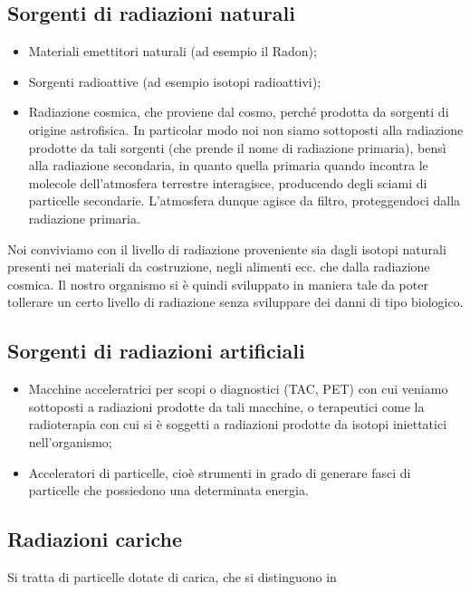 \subsection{Sorgenti di radiazioni naturali}

\begin{itemize}[leftmargin=0.5cm]
    \item Materiali emettitori naturali (ad esempio il Radon);
    \item Sorgenti radioattive (ad esempio isotopi radioattivi);
    \item Radiazione cosmica, che proviene dal cosmo, perché prodotta da sorgenti di origine astrofisica. In particolar modo noi non siamo sottoposti alla radiazione prodotte da tali sorgenti (che prende il nome di radiazione primaria), bensì alla radiazione secondaria, in quanto quella primaria quando incontra le molecole dell'atmosfera terrestre interagisce, producendo degli sciami di particelle secondarie. L'atmosfera dunque agisce da filtro, proteggendoci dalla radiazione primaria.
\end{itemize}

Noi conviviamo con il livello di radiazione proveniente sia dagli isotopi naturali presenti nei materiali da costruzione, negli alimenti ecc. che dalla radiazione cosmica. Il nostro organismo si è quindi sviluppato in maniera tale da poter tollerare un certo livello di radiazione senza sviluppare dei danni di tipo biologico.

\subsection{Sorgenti di radiazioni artificiali}

\begin{itemize}[leftmargin=0.5cm]
    \item Macchine acceleratrici per scopi o diagnostici (TAC, PET) con cui veniamo sottoposti a radiazioni prodotte da tali macchine, o terapeutici come la radioterapia con cui si è soggetti a radiazioni prodotte da isotopi iniettatici nell'organismo;
    \item Acceleratori di particelle, cioè strumenti in grado di generare fasci di particelle che possiedono una determinata energia.
\end{itemize}

\subsection{Radiazioni cariche}
Si tratta di particelle dotate di carica, che si distinguono in

